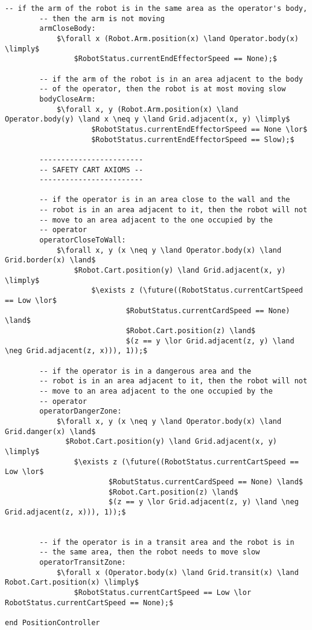 \begin{lstlisting}[fontadjust, mathescape, frame=single]
        -- if the arm of the robot is in the same area as the operator's body,
        -- then the arm is not moving
        armCloseBody:
            $\forall x (Robot.Arm.position(x) \land Operator.body(x) \limply$
                $RobotStatus.currentEndEffectorSpeed == None);$

        -- if the arm of the robot is in an area adjacent to the body
        -- of the operator, then the robot is at most moving slow
        bodyCloseArm:
            $\forall x, y (Robot.Arm.position(x) \land Operator.body(y) \land x \neq y \land Grid.adjacent(x, y) \limply$
                    $RobotStatus.currentEndEffectorSpeed == None \lor$
                    $RobotStatus.currentEndEffectorSpeed == Slow);$

        ------------------------       
        -- SAFETY CART AXIOMS --
        ------------------------

        -- if the operator is in an area close to the wall and the
        -- robot is in an area adjacent to it, then the robot will not
        -- move to an area adjacent to the one occupied by the
        -- operator
        operatorCloseToWall:
            $\forall x, y (x \neq y \land Operator.body(x) \land Grid.border(x) \land$
                $Robot.Cart.position(y) \land Grid.adjacent(x, y) \limply$
                    $\exists z (\future((RobotStatus.currentCartSpeed == Low \lor$
                            $RobutStatus.currentCardSpeed == None) \land$
                            $Robot.Cart.position(z) \land$
                            $(z == y \lor Grid.adjacent(z, y) \land \neg Grid.adjacent(z, x))), 1));$

        -- if the operator is in a dangerous area and the
        -- robot is in an area adjacent to it, then the robot will not
        -- move to an area adjacent to the one occupied by the
        -- operator
        operatorDangerZone:
            $\forall x, y (x \neq y \land Operator.body(x) \land Grid.danger(x) \land$
              $Robot.Cart.position(y) \land Grid.adjacent(x, y) \limply$
                $\exists z (\future((RobotStatus.currentCartSpeed == Low \lor$
                        $RobutStatus.currentCardSpeed == None) \land$
                        $Robot.Cart.position(z) \land$
                        $(z == y \lor Grid.adjacent(z, y) \land \neg Grid.adjacent(z, x))), 1));$


        -- if the operator is in a transit area and the robot is in
        -- the same area, then the robot needs to move slow
        operatorTransitZone:
            $\forall x (Operator.body(x) \land Grid.transit(x) \land Robot.Cart.position(x) \limply$
                $RobotStatus.currentCartSpeed == Low \lor RobotStatus.currentCartSpeed == None);$

end PositionController                
\end{lstlisting}